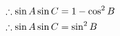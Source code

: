 \documentclass[preview]{standalone}
\begin{document}
\begin{align*}
\special{dvisvgm:raw <g id='unique000'>}&\therefore \sin A\sin C = 1 - \cos^2 B\\&\therefore \sin A\sin C=\sin^2 B\special{dvisvgm:raw </g>}
\end{align*}
\end{document}
